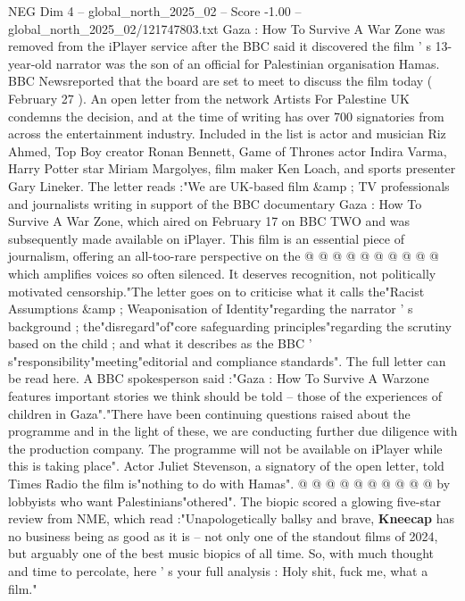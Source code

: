 \begin{textsample}{NEG Dim 4 – global\_north\_2025\_02 – Score -1.00 – global\_north\_2025\_02/121747803.txt}  \label{ex:f4_neg_401}
Gaza : How To Survive A War Zone was removed from the iPlayer service after the BBC said it discovered the film ' s 13-year-old narrator was the son of an official for Palestinian organisation Hamas.
BBC Newsreported that the board are set to meet to discuss the film today ( February 27 ).
An open letter from the network Artists For Palestine UK condemns the decision, and at the time of writing has over 700 signatories from across the entertainment industry.
Included in the list is actor and musician Riz Ahmed, Top Boy creator Ronan Bennett, Game of Thrones actor Indira Varma, Harry Potter star Miriam Margolyes, film maker Ken Loach, and sports presenter Gary Lineker.
The letter reads :"We are UK-based film \&amp ; TV professionals and journalists writing in support of the BBC documentary Gaza : How To Survive A War Zone, which aired on February 17 on BBC TWO and was subsequently made available on iPlayer.
This film is an essential piece of journalism, offering an all-too-rare perspective on the @ @ @ @ @ @ @ @ @ @ which amplifies voices so often silenced.
It deserves recognition, not politically motivated censorship."The letter goes on to criticise what it calls the"Racist Assumptions \&amp ; Weaponisation of Identity"regarding the narrator ' s background ; the"disregard"of"core safeguarding principles"regarding the scrutiny based on the child ; and what it describes as the BBC ' s"responsibility"meeting"editorial and compliance standards".
The full letter can be read here.
A BBC spokesperson said :"Gaza : How To Survive A Warzone features important stories we think should be told -- those of the experiences of children in Gaza"."There have been continuing questions raised about the programme and in the light of these, we are conducting further due diligence with the production company.
The programme will not be available on iPlayer while this is taking place".
Actor Juliet Stevenson, a signatory of the open letter, told Times Radio the film is"nothing to do with Hamas". @ @ @ @ @ @ @ @ @ @ by lobbyists who want Palestinians"othered".
The biopic scored a glowing five-star review from NME, which read :"Unapologetically ballsy and brave, \textbf{Kneecap} has no business being as good as it is -- not only one of the standout films of 2024, but arguably one of the best music biopics of all time.
So, with much thought and time to percolate, here ' s your full analysis : Holy shit, fuck me, what a film."

\end{textsample}
